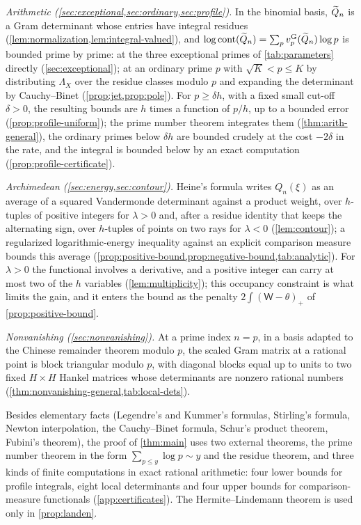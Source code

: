 \emph{Arithmetic (\cref{sec:exceptional,sec:ordinary,sec:profile}).} In the binomial basis, $\widetilde{Q}_n$ is a Gram determinant whose entries have integral residues (\cref{lem:normalization,lem:integral-valued}), and $\log\operatorname{cont}(\widetilde{Q}_n)=\sum_pv^{\mathrm{G}}_{p}(\widetilde{Q}_n)\log p$ is bounded prime by prime: at the three exceptional primes of \cref{tab:parameters} directly (\cref{sec:exceptional}); at an ordinary prime $p$ with $\sqrt K<p\le K$ by distributing $\Lambda_X$ over the residue classes modulo $p$ and expanding the determinant by Cauchy--Binet (\cref{prop:jet,prop:pole}). For $p\ge\delta h$, with a fixed small cut-off $\delta>0$, the resulting bounds are $h$ times a function of $p/h$, up to a bounded error (\cref{prop:profile-uniform}); the prime number theorem integrates them (\cref{thm:arith-general}), the ordinary primes below $\delta h$ are bounded crudely at the cost $-2\delta$ in the rate, and the integral is bounded below by an exact computation (\cref{prop:profile-certificate}).

\emph{Archimedean (\cref{sec:energy,sec:contour}).} Heine's formula writes $Q_n(\xi)$ as an average of a squared Vandermonde determinant against a product weight, over $h$-tuples of positive integers for $\lambda>0$ and, after a residue identity that keeps the alternating sign, over $h$-tuples of points on two rays for $\lambda<0$ (\cref{lem:contour}); a regularized logarithmic-energy inequality against an explicit comparison measure bounds this average (\cref{prop:positive-bound,prop:negative-bound,tab:analytic}). For $\lambda>0$ the functional involves a derivative, and a positive integer can carry at most two of the $h$ variables (\cref{lem:multiplicity}); this occupancy constraint is what limits the gain, and it enters the bound as the penalty $2\int(\mathsf W-\theta)_+$ of \cref{prop:positive-bound}.

\emph{Nonvanishing (\cref{sec:nonvanishing}).} At a prime index $n=p$, in a basis adapted to the Chinese remainder theorem modulo $p$, the scaled Gram matrix at a rational point is block triangular modulo $p$, with diagonal blocks equal up to units to two fixed $H\times H$ Hankel matrices whose determinants are nonzero rational numbers (\cref{thm:nonvanishing-general,tab:local-dets}).

Besides elementary facts (Legendre's and Kummer's formulas, Stirling's formula, Newton interpolation, the Cauchy--Binet formula, Schur's product theorem, Fubini's theorem), the proof of \cref{thm:main} uses two external theorems, the prime number theorem in the form $\sum_{p\le y}\log p\sim y$ and the residue theorem, and three kinds of finite computations in exact rational arithmetic: four lower bounds for profile integrals, eight local determinants and four upper bounds for comparison-measure functionals (\cref{app:certificates}). The Hermite--Lindemann theorem is used only in \cref{prop:landen}.

